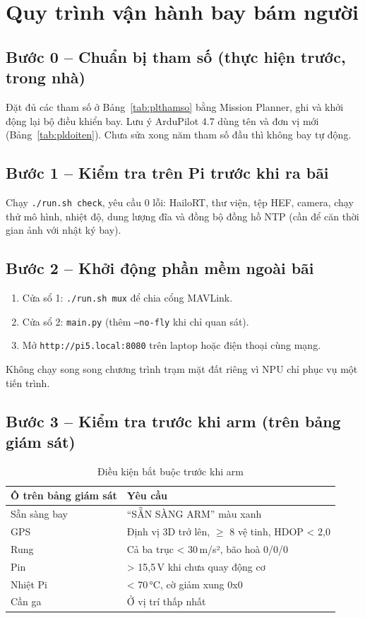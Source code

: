 \chapter{Quy trình vận hành bay bám người}
\label{pl:c}

\section*{Bước 0 -- Chuẩn bị tham số (thực hiện trước, trong nhà)}
Đặt đủ các tham số ở Bảng~\ref{tab:plthamso} bằng Mission Planner, ghi và khởi động lại bộ điều khiển bay. Lưu ý ArduPilot 4.7 dùng tên và đơn vị mới (Bảng~\ref{tab:pldoiten}). Chưa sửa xong năm tham số đầu thì không bay tự động.

\section*{Bước 1 -- Kiểm tra trên Pi trước khi ra bãi}
Chạy \texttt{./run.sh check}, yêu cầu 0 lỗi: HailoRT, thư viện, tệp HEF, camera, chạy thử mô hình, nhiệt độ, dung lượng đĩa và đồng bộ đồng hồ NTP (cần để căn thời gian ảnh với nhật ký bay).

\section*{Bước 2 -- Khởi động phần mềm ngoài bãi}
\begin{enumerate}
\item Cửa sổ 1: \texttt{./run.sh mux} để chia cổng MAVLink.
\item Cửa sổ 2: \texttt{main.py} (thêm \texttt{--no-fly} khi chỉ quan sát).
\item Mở \texttt{http://pi5.local:8080} trên laptop hoặc điện thoại cùng mạng.
\end{enumerate}
Không chạy song song chương trình trạm mặt đất riêng vì NPU chỉ phục vụ một tiến trình.

\section*{Bước 3 -- Kiểm tra trước khi arm (trên bảng giám sát)}
\begin{table}[H]
\centering
\caption{Điều kiện bắt buộc trước khi arm}
\small
\renewcommand{\arraystretch}{1.15}
\begin{tabular}{@{}ll@{}}
\toprule
\textbf{Ô trên bảng giám sát} & \textbf{Yêu cầu}\\
\midrule
Sẵn sàng bay & ``SẴN SÀNG ARM'' màu xanh\\
GPS & Định vị 3D trở lên, $\ge$ 8 vệ tinh, HDOP < 2,0\\
Rung & Cả ba trục < 30\,m/s², bão hoà 0/0/0\\
Pin & > 15,5\,V khi chưa quay động cơ\\
Nhiệt Pi & < 70\,°C, cờ giảm xung 0x0\\
Cần ga & Ở vị trí thấp nhất\\
\bottomrule
\end{tabular}
\end{table}

